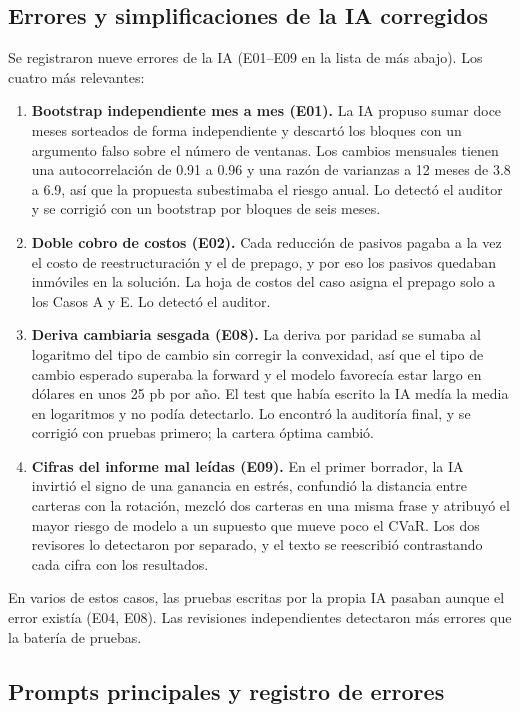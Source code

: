 \subsection{Errores y simplificaciones de la IA corregidos}
Se registraron nueve errores de la IA (E01--E09 en la lista de más abajo). Los cuatro más relevantes:
\begin{enumerate}
  \item \textbf{Bootstrap independiente mes a mes (E01).} La IA propuso sumar doce meses sorteados de forma
    independiente y descartó los bloques con un argumento falso sobre el número de ventanas. Los cambios
    mensuales tienen una autocorrelación de 0.91 a 0.96 y una razón de varianzas a 12 meses de 3.8 a 6.9, así
    que la propuesta subestimaba el riesgo anual. Lo detectó el auditor y se corrigió con un bootstrap por
    bloques de seis meses.
  \item \textbf{Doble cobro de costos (E02).} Cada reducción de pasivos pagaba a la vez el costo de
    reestructuración y el de prepago, y por eso los pasivos quedaban inmóviles en la solución. La hoja de
    costos del caso asigna el prepago solo a los Casos A y E. Lo detectó el auditor.
  \item \textbf{Deriva cambiaria sesgada (E08).} La deriva por paridad se sumaba al logaritmo del tipo de
    cambio sin corregir la convexidad, así que el tipo de cambio esperado superaba la forward y el modelo
    favorecía estar largo en dólares en unos 25 pb por año. El test que había escrito la IA medía la media en
    logaritmos y no podía detectarlo. Lo encontró la auditoría final, y se corrigió con pruebas primero; la
    cartera óptima cambió.
  \item \textbf{Cifras del informe mal leídas (E09).} En el primer borrador, la IA invirtió el signo de una
    ganancia en estrés, confundió la distancia entre carteras con la rotación, mezcló dos carteras en una
    misma frase y atribuyó el mayor riesgo de modelo a un supuesto que mueve poco el CVaR. Los dos revisores
    lo detectaron por separado, y el texto se reescribió contrastando cada cifra con los resultados.
\end{enumerate}
En varios de estos casos, las pruebas escritas por la propia IA pasaban aunque el error existía (E04, E08).
Las revisiones independientes detectaron más errores que la batería de pruebas.

\subsection{Prompts principales y registro de errores}
